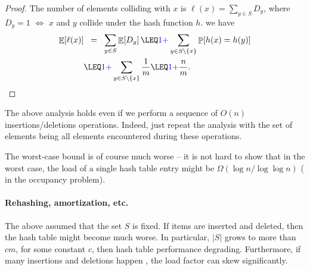 \begin{proof}
    The number of elements colliding with $x$ is
    $\ell(x) = \sum_{y \in S} D_y$, where $D_y=1$ $\iff$ $x$ and $y$
    collide under the hash function $h$.
    we have
    \begin{align*}
        \Ex{\ell(x)}%
        &\EQ%
        \sum_{y \in S}\Ex{D_y}%
        \LEQ%
        \newX{1 +} \sum_{y \in S \setminus \{x\}}\Prob{h(x) = h(y)}
        \\&
        \LEQ \newX{1 +} \sum_{y \in S \setminus \{x\}} \frac{1}{m}%
        \LEQ \newX{1 +} \frac{n}{m}.
    \end{align*}
\end{proof}

\begin{remark}
    The above analysis holds even if we perform a sequence of $O(n)$
    insertions/deletions operations. Indeed, just repeat the analysis
    with the set of elements being all elements encountered during
    these operations.

    The worst-case bound is of course much worse -- it is not hard to
    show that in the worst case, the load of a single hash table entry
    might be $\Omega(\log n/\log \log n)$ ( in the occupancy
    problem).
\end{remark}

\paragraph*{Rehashing, amortization, etc. }
The above assumed that the set $S$ is fixed.  If items are inserted
and deleted, then the hash table might become much worse.  In
particular,  $|S|$ grows to more than $cm$, for some constant $c$, then
hash table performance  degrading.  Furthermore, if many
insertions and deletions happen , the load factor can skew significantly.

